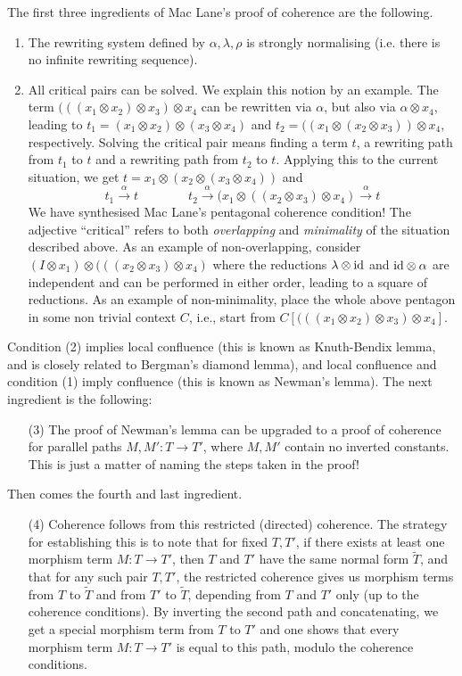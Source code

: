 The first three ingredients of Mac Lane's proof of coherence are the following.
\begin{enumerate}
\item The rewriting system defined by $\alpha,\lambda,\rho$ is strongly normalising (i.e. there is no infinite rewriting sequence).
\item All critical pairs can be solved.  We explain this notion by an example.  The term $(((x_1\otimes x_2)\otimes x_3)\otimes x_4$ can be rewritten via $\alpha$, but also via $\alpha\otimes x_4$, leading to $t_1=(x_1\otimes x_2)\otimes (x_3\otimes x_4)$ and $t_2=((x_1\otimes (x_2\otimes x_3))\otimes x_4$, respectively.  Solving the critical pair means finding a term $t$, a rewriting path from $t_1$ to $t$ and a rewriting path from $t_2$ to $t$. Applying this to the current situation, we get $t=x_1\otimes(x_2\otimes (x_3\otimes x_4))$ and
$$t_1 \stackrel{\alpha}{\longrightarrow} t \quad\quad\quad\quad t_2 \stackrel{\alpha}{\longrightarrow} (x_1\otimes ((x_2\otimes x_3)\otimes x_4) \stackrel{\alpha}{\longrightarrow} t$$
We have synthesised Mac Lane's pentagonal coherence condition! The adjective ``critical'' refers to both {\em overlapping} and {\em minimality} of the situation described above. As an example of non-overlapping, consider $(I\otimes x_1)\otimes(((x_2\otimes x_3)\otimes x_4)$ where the reductions $\lambda\otimes \mathrm{id}$ and $\mathrm{id} \otimes\alpha$ are independent and can be performed in either order, leading to a square of reductions. As an example of non-minimality, place the whole above pentagon in some non trivial context $C$, i.e., start from 
$C[(((x_1\otimes x_2)\otimes x_3)\otimes x_4]$.
\end{enumerate}
Condition (2) implies local confluence (this is known as Knuth-Bendix lemma, and is closely related to Bergman's diamond lemma), and local confluence and condition (1) imply confluence (this is known as Newman's lemma). The next ingredient is the following:
\begin{enumerate}
\item[(3)]
The proof of Newman's lemma can be upgraded to a proof of coherence for parallel paths $M,M':T\rightarrow T'$, where $M,M'$ contain no inverted constants. This is just a matter of naming the steps taken in the proof! 
\end{enumerate}
Then comes the fourth  and last ingredient.
\begin{enumerate}
\item[(4)] Coherence follows from this restricted (directed) coherence. The strategy for establishing this is to note that for fixed $T,T'$, if   there exists at least one morphism term $M:T\rightarrow T'$, then  $T$ and $T'$  have the same normal form $\tilde T$, and that for any such pair 
$T,T'$, the restricted coherence gives  us morphism terms from $T$ to $\tilde T$ and from $T'$ to $\tilde T$, depending from $T$ and $T'$ only (up to the coherence conditions). By inverting the second path and concatenating, we get a special morphism term from $T$ to $T'$ and one shows that every morphism term $M:T\rightarrow T'$ is equal to this path, modulo the coherence conditions.
\end{enumerate}
